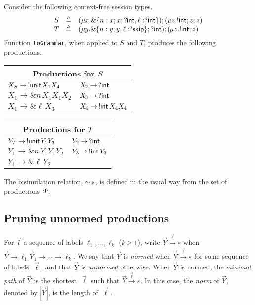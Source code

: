 \begin{example}
\label{ex:productions}
Consider the following context-free session types.
%
\begin{equation*}
\begin{array}{lll}
    S & \triangleq & (\mu x . \&\{n: x;x;?\mathsf{int}, \ell: ?\mathsf{int}\});(\mu z . !\mathsf{int} ; z;z)\\
    T & \triangleq & (\mu y . \&\{n: y;y, \ell: ?\mathsf{skip}\};?\mathsf{int});(\mu z . !\mathsf{int} ; z)
\end{array}
\end{equation*}
%
Function \lstinline{toGrammar}, when applied to $S$ and $T$, produces
the following productions.
\begin{center}
  \begin{tabular}{l l}
    \multicolumn{2}{c}{Productions for $S$}\\ \hline
    $X_S \rightarrow \,!\mathsf{unit}\, X_1 X_4$ &$X_2 \rightarrow \,? \mathsf{int}$\\
    $X_1 \rightarrow \& n\, X_1 X_1 X_2$&$X_3 \rightarrow \,? \mathsf{int}$\\
    $X_1 \rightarrow \& \ell\, X_3$ &$X_4 \rightarrow \,!\mathsf{int}\, X_4 X_4$\\
  \end{tabular} \qquad
  \begin{tabular}{l l}
    \multicolumn{2}{c}{Productions for $T$}\\ \hline
    $Y_T \rightarrow \,!\mathsf{unit}\, Y_1 Y_3 $&$Y_2 \rightarrow \,? \mathsf{int}$\\
    $Y_1 \rightarrow \& n\, Y_1 Y_1 Y_2 $&$Y_3 \rightarrow \,!\mathsf{int}\, Y_3$\\
    $Y_1 \rightarrow \& \ell \,Y_2 $ &
  \end{tabular}
\end{center}
\end{example}

The bisimulation relation, $\sim_{\mathcal P}$, is defined in the usual way
from the set of productions~$\mathcal P$.

\subsection{Pruning unnormed productions}
\label{subsec:prune}

For $\vec l$ a sequence of labels $\ell_1,\ldots, \ell_k$ ($k\ge1$),
write $\vec Y \xrightarrow{\vec \ell} \varepsilon$ when
$\vec Y \rightarrow \ell_1\vec Y_1 \rightarrow \cdots \rightarrow
\ell_k$.
%
We say that $\vec Y$ is \emph{normed} when
$\vec Y \xrightarrow{\vec \ell} \varepsilon$ for some sequence of
labels~$\vec \ell$, and that $\vec Y$ is \emph{unnormed} otherwise.
%
When $\vec Y$ is normed, the \emph{minimal path} of $\vec Y$ is the
shortest~$\vec \ell$ such that $\vec Y \xrightarrow{\vec\ell}
\varepsilon$.
%
In this case, the \emph{norm} of $\vec Y$, denoted by $|\vec Y|$, is
the length of~$\vec\ell$.

